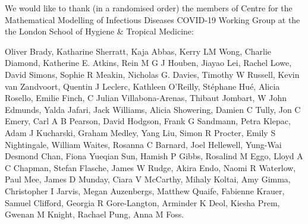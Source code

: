 \documentclass[
]{article}
\author{}
\date{\vspace{-2.5em}}
\begin{document}
We would like to thank (in a randomised order) the members of
Centre for the Mathematical Modelling of Infectious Diseases COVID-19
Working Group at the the London School of Hygiene \& Tropical Medicine:

Oliver Brady, Katharine Sherratt, Kaja Abbas, Kerry LM Wong, Charlie
Diamond, Katherine E. Atkins, Rein M G J Houben, Jiayao Lei, Rachel
Lowe, David Simons, Sophie R Meakin, Nicholas G. Davies, Timothy W
Russell, Kevin van Zandvoort, Quentin J Leclerc, Kathleen O'Reilly,
Stéphane Hué, Alicia Rosello, Emilie Finch, C Julian Villabona-Arenas,
Thibaut Jombart, W John Edmunds, Yalda Jafari, Jack Williams, Alicia
Showering, Damien C Tully, Jon C Emery, Carl A B Pearson, David Hodgson,
Frank G Sandmann, Petra Klepac, Adam J Kucharski, Graham Medley, Yang
Liu, Simon R Procter, Emily S Nightingale, William Waites, Rosanna C
Barnard, Joel Hellewell, Yung-Wai Desmond Chan, Fiona Yueqian Sun,
Hamish P Gibbs, Rosalind M Eggo, Lloyd A C Chapman, Stefan Flasche,
James W Rudge, Akira Endo, Naomi R Waterlow, Paul Mee, James D Munday,
Ciara V McCarthy, Mihaly Koltai, Amy Gimma, Christopher I Jarvis, Megan
Auzenbergs, Matthew Quaife, Fabienne Krauer, Samuel Clifford, Georgia R
Gore-Langton, Arminder K Deol, Kiesha Prem, Gwenan M Knight, Rachael
Pung, Anna M Foss.
\end{document}
